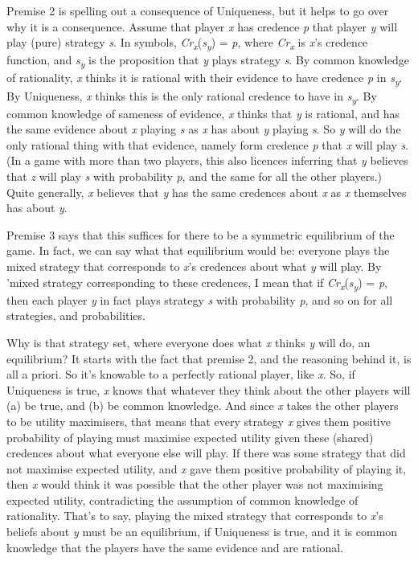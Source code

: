 \documentclass[
  12pt,
  letterpaper,
  DIV=11,
  numbers=noendperiod]{scrreprt}
\begin{document}
Premise 2 is spelling out a consequence of Uniqueness, but it helps to
go over why it is a consequence. Assume that player \emph{x} has
credence \emph{p} that player \emph{y} will play (pure) strategy
\emph{s}. In symbols,
\emph{Cr\textsubscript{x}}(\emph{s\textsubscript{y}}) = \emph{p}, where
\emph{Cr\textsubscript{x}} is \emph{x}'s credence function, and
\emph{s\textsubscript{y}} is the proposition that \emph{y} plays
strategy \emph{s}. By common knowledge of rationality, \emph{x} thinks
it is rational with their evidence to have credence \emph{p} in
\emph{s\textsubscript{y}}. By Uniqueness, \emph{x} thinks this is the
only rational credence to have in \emph{s\textsubscript{y}}. By common
knowledge of sameness of evidence, \emph{x} thinks that \emph{y} is
rational, and has the same evidence about \emph{x} playing \emph{s} as
\emph{x} has about \emph{y} playing \emph{s}. So \emph{y} will do the
only rational thing with that evidence, namely form credence \emph{p}
that \emph{x} will play \emph{s}. (In a game with more than two players,
this also licences inferring that \emph{y} believes that \emph{z} will
play \emph{s} with probability \emph{p}, and the same for all the other
players.) Quite generally, \emph{x} believes that \emph{y} has the same
credences about \emph{x} as \emph{x} themselves has about \emph{y}.

Premise 3 says that this suffices for there to be a symmetric
equilibrium of the game. In fact, we can say what that equilibrium would
be: everyone plays the mixed strategy that corresponds to \emph{x}'s
credences about what \emph{y} will play. By 'mixed strategy
corresponding to these credences, I mean that if
\emph{Cr\textsubscript{x}}(\emph{s\textsubscript{y}}) = \emph{p}, then
each player \emph{y} in fact plays strategy \emph{s} with probability
\emph{p}, and so on for all strategies, and probabilities.

Why is that strategy set, where everyone does what \emph{x} thinks
\emph{y} will do, an equilibrium? It starts with the fact that premise
2, and the reasoning behind it, is all a priori. So it's knowable to a
perfectly rational player, like \emph{x}. So, if Uniqueness is true,
\emph{x} knows that whatever they think about the other players will (a)
be true, and (b) be common knowledge. And since \emph{x} takes the other
players to be utility maximisers, that means that every strategy
\emph{x} gives them positive probability of playing must maximise
expected utility given these (shared) credences about what everyone else
will play. If there was some strategy that did not maximise expected
utility, and \emph{x} gave them positive probability of playing it, then
\emph{x} would think it was possible that the other player was not
maximising expected utility, contradicting the assumption of common
knowledge of rationality. That's to say, playing the mixed strategy that
corresponds to \emph{x}'s beliefs about \emph{y} must be an equilibrium,
if Uniqueness is true, and it is common knowledge that the players have
the same evidence and are rational.
\end{document}

